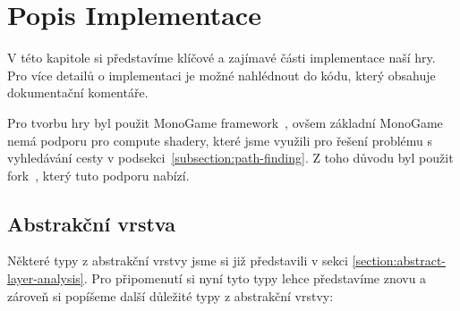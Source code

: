 \chapter{Popis Implementace}
V této kapitole si představíme klíčové a zajímavé části implementace naší hry. Pro více detailů o implementaci je možné nahlédnout do kódu, který obsahuje dokumentační komentáře.

Pro tvorbu hry byl použit MonoGame framework~\cite{MonoGame}, ovšem základní MonoGame nemá podporu pro compute shadery, které jsme využili pro řešení problému s vyhledávání cesty v podsekci~\ref{subsection:path-finding}. Z toho důvodu byl použit fork~\cite{MonoGameCptMax}, který tuto podporu nabízí.

\section{Abstrakční vrstva}
Některé typy z abstrakční vrstvy jsme si již představili v sekci \ref{section:abstract-layer-analysis}. Pro připomenutí si nyní tyto typy lehce představíme znovu a zároveň si popíšeme další důležité typy z abstrakční vrstvy:

